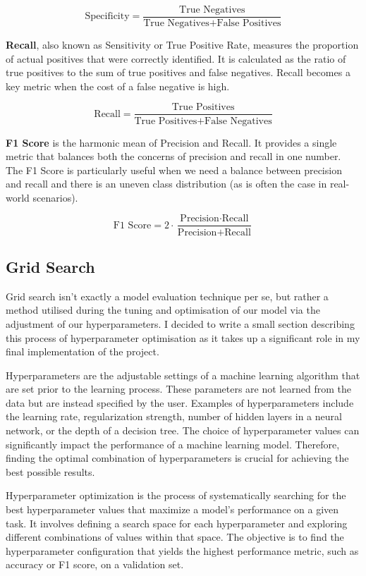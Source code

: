 \documentclass[letterpaper,10pt]{article}
\begin{document}
\[ \text{Specificity} = \frac{\text{True Negatives}}{\text{True Negatives} + \text{False Positives}} \]

\textbf{Recall}, also known as Sensitivity or True Positive Rate, measures the proportion of actual positives that were correctly identified. It is calculated as the ratio of true positives to the sum of true positives and false negatives. Recall becomes a key metric when the cost of a false negative is high. \par

\[ \text{Recall} = \frac{\text{True Positives}}{\text{True Positives} + \text{False Negatives}} \]

\textbf{F1 Score} is the harmonic mean of Precision and Recall. It provides a single metric that balances both the concerns of precision and recall in one number. The F1 Score is particularly useful when we need a balance between precision and recall and there is an uneven class distribution (as is often the case in real-world scenarios). \par

\[ \text{F1 Score} = 2 \cdot \frac{\text{Precision} \cdot \text{Recall}}{\text{Precision} + \text{Recall}} \]

\subsection{Grid Search}
Grid search isn't exactly a model evaluation technique per se, but rather a method utilised during the tuning and optimisation of our model via the adjustment of our hyperparameters. I decided to write a small section describing this process of hyperparameter optimisation as it takes up a significant role in my final implementation of the project.\par
Hyperparameters are the adjustable settings of a machine learning algorithm that are set prior to the learning process. These parameters are not learned from the data but are instead specified by the user. Examples of hyperparameters include the learning rate, regularization strength, number of hidden layers in a neural network, or the depth of a decision tree. The choice of hyperparameter values can significantly impact the performance of a machine learning model. Therefore, finding the optimal combination of hyperparameters is crucial for achieving the best possible results. \par

Hyperparameter optimization is the process of systematically searching for the best hyperparameter values that maximize a model's performance on a given task. It involves defining a search space for each hyperparameter and exploring different combinations of values within that space. The objective is to find the hyperparameter configuration that yields the highest performance metric, such as accuracy or F1 score, on a validation set. \par
\end{document}
